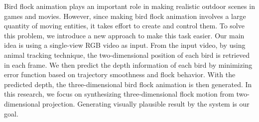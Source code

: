 Bird flock animation plays an important role in making realistic outdoor scenes in games and movies. However, since making bird flock animation involves a large quantity of moving entities, it takes effort to create and control them. To solve this problem, we introduce a new approach to make this task easier. Our main idea is using a single-view RGB video as input.  From the input video, by using animal tracking technique, the two-dimensional position of each bird is retrieved in each frame. We then predict the depth information of each bird by minimizing error function based on trajectory smoothness and flock behavior. With the predicted depth, the three-dimensional bird flock animation is then generated. In this research, we focus on synthesizing three-dimensional flock motion from two-dimensional projection. Generating visually plausible result by the system is our goal.